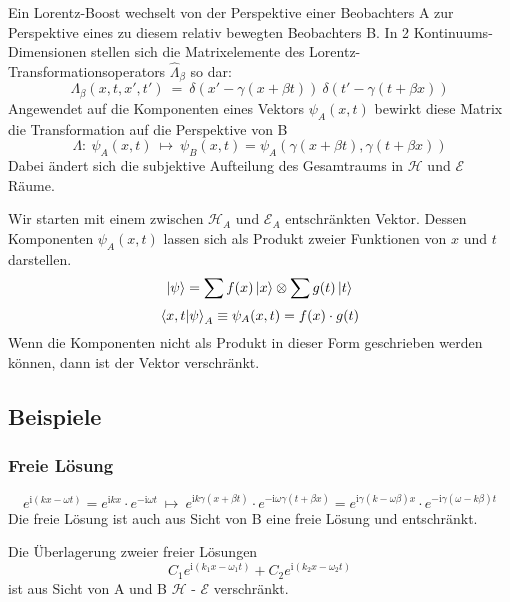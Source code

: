 \documentclass[12pt]{article}
\begin{document}
Ein Lorentz-Boost wechselt von der Perspektive einer Beobachters A zur Perspektive eines zu diesem relativ bewegten Beobachters B. In 2 Kontinuums-Dimensionen stellen sich die Matrixelemente des Lorentz-Transformationsoperators $\hat{\Lambda}_\beta$ so dar:
\begin{equation*}
\Lambda_\beta(x,t,x',t')\ =\ \delta(x'-\gamma(x+\beta t))\ \delta(t'-\gamma(t+\beta x))
\end{equation*}
Angewendet auf die Komponenten eines Vektors $\psi_A(x,t)$ bewirkt diese Matrix die Transformation auf die Perspektive von B
\begin{equation*}
\Lambda:\ \psi_A(x,t)\ \mapsto\ \psi_B(x,t) = \psi_A(\gamma(x+\beta t),\gamma(t+\beta x))
\end{equation*}
Dabei ändert sich die subjektive Aufteilung des Gesamtraums in $\mathscr{H}$ und $\mathscr{E}$ Räume.

Wir starten mit einem zwischen $\mathscr{H}_A$ und $\mathscr{E}_A$ entschränkten Vektor. Dessen Komponenten $\psi_A(x,t)$ lassen sich als Produkt zweier Funktionen von $x$ und $t$ darstellen. 
\begin{equation*}
\ket{\psi} = \sum f(x) \ket{x} \otimes  \sum g(t) \ket{t}
\end{equation*}
\begin{equation*}
\bra{x,t}\ket{\psi}_A \equiv \psi_A(x,t) = f(x) \cdot g(t)
\end{equation*}
Wenn die Komponenten nicht als Produkt in dieser Form geschrieben werden können, dann ist der Vektor verschränkt. 

\subsection{Beispiele}

\subsubsection{Freie Lösung}

\begin{equation*}
e^{\mathrm{i}(kx-\omega t)}
= 
e^{\mathrm{i}kx}\cdot e^{-\mathrm{i}\omega t}
\ \mapsto \ 
e^{\mathrm{i}k\gamma(x+\beta t)} \cdot e^{-\mathrm{i}\omega \gamma(t+\beta x)}
= 
e^{\mathrm{i}\gamma(k-\omega \beta)x} \cdot e^{-\mathrm{i}\gamma(\omega- k \beta)t}
\end{equation*}
Die freie Lösung ist auch aus Sicht von B eine freie Lösung und entschränkt. 

Die Überlagerung zweier freier Lösungen
\begin{equation*}
C_1 e^{\mathrm{i}(k_1 x-\omega_1 t)} + C_2 e^{\mathrm{i}(k_2 x-\omega_2 t)}
\end{equation*}
ist aus Sicht von A und B $\mathscr{H}$ - $\mathscr{E}$  verschränkt.
\end{document}
